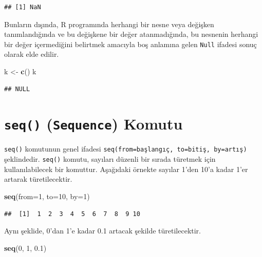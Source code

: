 \documentclass[
]{book}
\newenvironment{Shaded}{\begin{snugshade}}{\end{snugshade}}
\newcommand{\AttributeTok}[1]{\textcolor[rgb]{0.13,0.29,0.53}{#1}}
\newcommand{\DecValTok}[1]{\textcolor[rgb]{0.00,0.00,0.81}{#1}}
\newcommand{\FloatTok}[1]{\textcolor[rgb]{0.00,0.00,0.81}{#1}}
\newcommand{\FunctionTok}[1]{\textcolor[rgb]{0.13,0.29,0.53}{\textbf{#1}}}
\newcommand{\NormalTok}[1]{#1}
\newcommand{\OtherTok}[1]{\textcolor[rgb]{0.56,0.35,0.01}{#1}}
\begin{document}
\begin{verbatim}
## [1] NaN
\end{verbatim}

Bunların dışında, R programında herhangi bir nesne veya değişken tanımlandığında ve bu değişkene bir değer atanmadığında, bu nesnenin herhangi bir değer içermediğini belirtmek amacıyla boş anlamına gelen \texttt{Null} ifadesi sonuç olarak elde edilir.

\begin{Shaded}
\begin{Highlighting}[]
\NormalTok{k }\OtherTok{\textless{}{-}} \FunctionTok{c}\NormalTok{() }
\NormalTok{k }
\end{Highlighting}
\end{Shaded}

\begin{verbatim}
## NULL
\end{verbatim}

\section{\texorpdfstring{\texttt{seq()} (\texttt{Sequence}) Komutu}{seq() (Sequence) Komutu}}\label{seq-sequence-komutu}

\texttt{seq()} komutunun genel ifadesi \texttt{seq(from=başlangıç,\ to=bitiş,\ by=artış)} şeklindedir. \texttt{seq()} komutu, sayıları düzenli bir sırada türetmek için kullanılabilecek bir komuttur. Aşağıdaki örnekte sayılar 1'den 10'a kadar 1'er artarak türetilecektir.

\begin{Shaded}
\begin{Highlighting}[]
\FunctionTok{seq}\NormalTok{(}\AttributeTok{from=}\DecValTok{1}\NormalTok{, }\AttributeTok{to=}\DecValTok{10}\NormalTok{, }\AttributeTok{by=}\DecValTok{1}\NormalTok{)}
\end{Highlighting}
\end{Shaded}

\begin{verbatim}
##  [1]  1  2  3  4  5  6  7  8  9 10
\end{verbatim}

Aynı şeklide, 0'dan 1'e kadar 0.1 artacak şekilde türetilecektir.

\begin{Shaded}
\begin{Highlighting}[]
\FunctionTok{seq}\NormalTok{(}\DecValTok{0}\NormalTok{, }\DecValTok{1}\NormalTok{, }\FloatTok{0.1}\NormalTok{)}
\end{Highlighting}
\end{Shaded}
\end{document}
